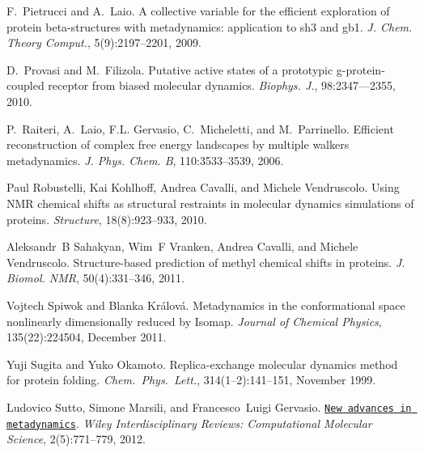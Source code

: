 \begin{DoxyDescription}
\item[\label{_CITEREF_pietrucci09jctc}%
\mbox{[}25\mbox{]}]F.~Pietrucci and A.~Laio. A collective variable for the efficient exploration of protein beta-\/structures with metadynamics\+: application to sh3 and gb1. {\itshape J. Chem. Theory Comput.}, 5(9)\+:2197--2201, 2009.


\item[\label{_CITEREF_provasi10abmd}%
\mbox{[}26\mbox{]}]D.~Provasi and M.~Filizola. Putative active states of a prototypic g-\/protein-\/coupled receptor from biased molecular dynamics. {\itshape Biophys. J.}, 98\+:2347--–2355, 2010.


\item[\label{_CITEREF_multiplewalkers}%
\mbox{[}27\mbox{]}]P.~Raiteri, A.~Laio, F.\+L. Gervasio, C.~Micheletti, and M.~Parrinello. Efficient reconstruction of complex free energy landscapes by multiple walkers metadynamics. {\itshape J. Phys. Chem. B}, 110\+:3533--3539, 2006.


\item[\label{_CITEREF_Robustelli:2010dn}%
\mbox{[}28\mbox{]}]Paul Robustelli, Kai Kohlhoff, Andrea Cavalli, and Michele Vendruscolo. Using N\+M\+R chemical shifts as structural restraints in molecular dynamics simulations of proteins. {\itshape Structure}, 18(8)\+:923--933, 2010.


\item[\label{_CITEREF_Sahakyan:2011bn}%
\mbox{[}29\mbox{]}]Aleksandr~B Sahakyan, Wim~F Vranken, Andrea Cavalli, and Michele Vendruscolo. Structure-\/based prediction of methyl chemical shifts in proteins. {\itshape J. Biomol. N\+M\+R}, 50(4)\+:331--346, 2011.


\item[\label{_CITEREF_Spiwok:2011ce}%
\mbox{[}30\mbox{]}]Vojtech Spiwok and Blanka Kr\'{a}lov\'{a}. Metadynamics in the conformational space nonlinearly dimensionally reduced by Isomap. {\itshape Journal of Chemical Physics}, 135(22)\+:224504, December 2011.


\item[\label{_CITEREF_sugi-okam99cpl}%
\mbox{[}31\mbox{]}]Yuji Sugita and Yuko Okamoto. Replica-\/exchange molecular dynamics method for protein folding. {\itshape Chem.~Phys.~Lett.}, 314(1--2)\+:141--151, November 1999.


\item[\label{_CITEREF_WCMS:WCMS1103}%
\mbox{[}32\mbox{]}]Ludovico Sutto, Simone Marsili, and Francesco~Luigi Gervasio. \href{http://dx.doi.org/10.1002/wcms.1103}{\tt New advances in metadynamics}. {\itshape Wiley Interdisciplinary Reviews\+: Computational Molecular Science}, 2(5)\+:771--779, 2012. 



\end{DoxyDescription}
